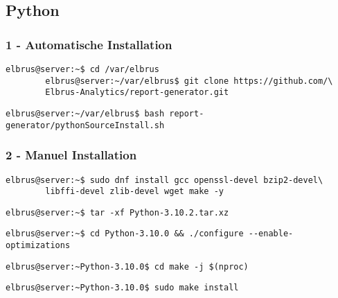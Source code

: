 \documentclass{article}
\begin{document}
	\newpage
	\subsection{Python}
	\lstset{style=commands}
	\subsubsection{1 - Automatische Installation}
	\begin{lstlisting}[caption={Kopieren des Github Repositorys 'report-generator'.}]
		elbrus@server:~$ cd /var/elbrus
		elbrus@server:~/var/elbrus$ git clone https://github.com/\
		Elbrus-Analytics/report-generator.git
	\end{lstlisting}

	\begin{lstlisting}[caption={Ausführen des 'pythonSourceInstall.sh' Scripts.}]
		elbrus@server:~/var/elbrus$ bash report-generator/pythonSourceInstall.sh
	\end{lstlisting}
	
	\subsubsection{2 - Manuel Installation}
	\begin{lstlisting}[caption={Installieren von benötigten Packeten und Abhängigkeiten.}]
		elbrus@server:~$ sudo dnf install gcc openssl-devel bzip2-devel\
		libffi-devel zlib-devel wget make -y
	\end{lstlisting}
	
	\begin{lstlisting}[caption={Extrahieren der installierent Dateien.}]
		elbrus@server:~$ tar -xf Python-3.10.2.tar.xz
	\end{lstlisting}
	
	\begin{lstlisting}[caption={Wechseln zu source Verzeichniss. Und ausführen des Konfigurations Scripts.}]
		elbrus@server:~$ cd Python-3.10.0 && ./configure --enable-optimizations
	\end{lstlisting}

	\begin{lstlisting}[caption={Starten des build Prozesses.}]
		elbrus@server:~Python-3.10.0$ cd make -j $(nproc)
	\end{lstlisting}
	
	\begin{lstlisting}[caption={Installieren von Python.}]
		elbrus@server:~Python-3.10.0$ sudo make install
	\end{lstlisting}
	
\end{document}
